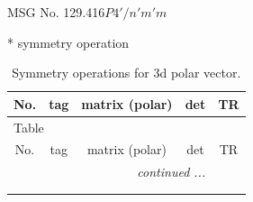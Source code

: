 \documentclass[fleqn,8pt]{jsarticle}
\begin{document}
\setcounter{MaxMatrixCols}{32}

\renewcommand{\tablename}{Table~}
\renewcommand{\figurename}{Figure~}
\begin{center}
\LARGE
MSG No. 129.416\quad$P4'/n'm'm$
\end{center}
* symmetry operation
\renewcommand{\arraystretch}{1.3}
\begin{longtable}{ccccc}
\caption{Symmetry operations for 3d polar vector.}
 \\
 \hline \hline
No. & tag & matrix (polar) & det & TR \\ \hline \endfirsthead

\multicolumn{4}{l}{\tablename\ \thetable{}} \\
 \hline \hline
No. & tag & matrix (polar) & det & TR \\ \hline \endhead

 \hline \hline
\multicolumn{4}{r}{\footnotesize\it continued ...} \\ \endfoot

 \hline \hline
\multicolumn{4}{r}{} \\ \endlastfoot


\end{longtable}
\end{document}
